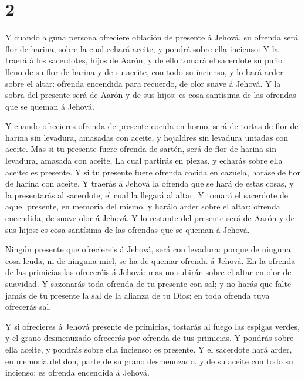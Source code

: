 \hypertarget{section-1}{%
\section{2}\label{section-1}}

 Y cuando alguna persona ofreciere oblación de presente á
Jehová, su ofrenda será flor de harina, sobre la cual echará aceite, y
pondrá sobre ella incienso:  Y la traerá á los sacerdotes,
hijos de Aarón; y de ello tomará el sacerdote su puño lleno de su flor
de harina y de su aceite, con todo su incienso, y lo hará arder sobre el
altar: ofrenda encendida para recuerdo, de olor suave á Jehová.
 Y la sobra del presente será de Aarón y de sus hijos: es
cosa santísima de las ofrendas que se queman á Jehová.

 Y cuando ofrecieres ofrenda de presente cocida en horno,
será de tortas de flor de harina sin levadura, amasadas con aceite, y
hojaldres sin levadura untadas con aceite.  Mas si tu
presente fuere ofrenda de sartén, será de flor de harina sin levadura,
amasada con aceite,  La cual partirás en piezas, y echarás
sobre ella aceite: es presente.  Y si tu presente fuere
ofrenda cocida en cazuela, haráse de flor de harina con aceite.
 Y traerás á Jehová la ofrenda que se hará de estas cosas, y
la presentarás al sacerdote, el cual la llegará al altar.  Y
tomará el sacerdote de aquel presente, en memoria del mismo, y harálo
arder sobre el altar; ofrenda encendida, de suave olor á Jehová.
 Y lo restante del presente será de Aarón y de sus hijos:
es cosa santísima de las ofrendas que se queman á Jehová.

 Ningún presente que ofreciereis á Jehová, será con
levadura: porque de ninguna cosa leuda, ni de ninguna miel, se ha de
quemar ofrenda á Jehová.  En la ofrenda de las primicias
las ofreceréis á Jehová: mas no subirán sobre el altar en olor de
suavidad.  Y sazonarás toda ofrenda de tu presente con sal;
y no harás que falte jamás de tu presente la sal de la alianza de tu
Dios: en toda ofrenda tuya ofrecerás sal.

 Y si ofrecieres á Jehová presente de primicias, tostarás
al fuego las espigas verdes, y el grano desmenuzado ofrecerás por
ofrenda de tus primicias.  Y pondrás sobre ella aceite, y
pondrás sobre ella incienso: es presente.  Y el sacerdote
hará arder, en memoria del don, parte de su grano desmenuzado, y de su
aceite con todo su incienso; es ofrenda encendida á Jehová.


